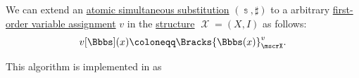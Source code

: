 \begin{algorithm}\label{alg:fol_assignment_substitution}\mimprovised
  We can extend an \hyperref[def:atomic_lambda_term_substitution]{atomic simultaneous substitution} \( (\Bbbs, \sharp) \) to a arbitrary \hyperref[def:fol_variable_assignment]{first-order variable assignment} \( v \) in the \hyperref[def:fol_structure]{structure} \( \mscrX = (X, I) \) as follows:
  \begin{equation}\label{eq:alg:fol_assignment_substitution}
    v[\Bbbs](x) \coloneqq \Bracks{\Bbbs(x)}_\mscrX^v.
  \end{equation}
\end{algorithm}
\begin{comments}
  \item This algorithm is implemented in \cite{notebook:code} as
\end{comments}

